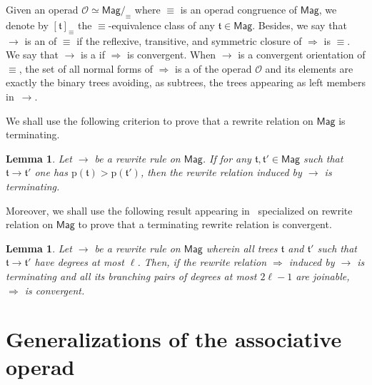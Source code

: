 \documentclass[10pt,reqno]{amsart}
\numberwithin{equation}{subsection}
\newtheorem{Lemma}[Theorem]{Lemma}
\newcommand{\Oca}{\mathcal{O}}
\newcommand{\Tfr}{\mathfrak{t}}
\newcommand{\Mag}{\mathsf{Mag}}
\newcommand{\PrefixWord}{\mathrm{p}}
\DeclareMathOperator{\Congr}{\equiv}
\DeclareMathOperator{\Rew}{\to}
\DeclareMathOperator{\RewContext}{\Rightarrow}
\begin{document}
Given an operad $\Oca \simeq \Mag/_{\Congr}$ where $\Congr$ is an operad
congruence of $\Mag$, we denote by $[\Tfr]_{\Congr}$ the
$\Congr$-equivalence class of any $\Tfr \in \Mag$. Besides, we say that
$\Rew$ is an  of $\Congr$ if the reflexive, transitive,
and symmetric closure of $\RewContext$ is $\Congr$. We say that $\Rew$
is a  if $\RewContext$ is convergent. When
$\Rew$ is a convergent orientation of $\Congr$, the set of all normal
forms of $\RewContext$ is a  of the
operad $\Oca$ and its elements are exactly the binary trees avoiding,
as subtrees, the trees appearing as left members in~$\Rew$.
\medbreak

We shall use the following criterion to prove that a rewrite relation on
$\Mag$ is terminating.
\medbreak

\begin{Lemma}\label{lem:prefix_word_termination}
    Let $\Rew$ be a rewrite rule on $\Mag$. If for any
    $\Tfr, \Tfr' \in \Mag$ such that $\Tfr \Rew \Tfr'$ one has
    $\PrefixWord(\Tfr) > \PrefixWord(\Tfr')$, then the rewrite relation
    induced by $\Rew$ is terminating.
\end{Lemma}
\medbreak

Moreover, we shall use the following result appearing in~\cite{Gir16}
specialized on rewrite relation on $\Mag$ to prove that a terminating
rewrite relation is convergent.
\medbreak

\begin{Lemma} \label{lem:degree_confluence}
    Let $\Rew$ be a rewrite rule on $\Mag$ wherein all trees $\Tfr$ and
    $\Tfr'$ such that $\Tfr \Rew \Tfr'$ have degrees at most $\ell$.
    Then, if the rewrite relation $\RewContext$ induced by $\Rew$ is
    terminating and all its branching pairs of degrees at most
    $2\ell - 1$ are joinable, $\RewContext$ is convergent.
\end{Lemma}
\medbreak



\section{Generalizations of the associative operad} \label{sec:CAs_d}
\end{document}
